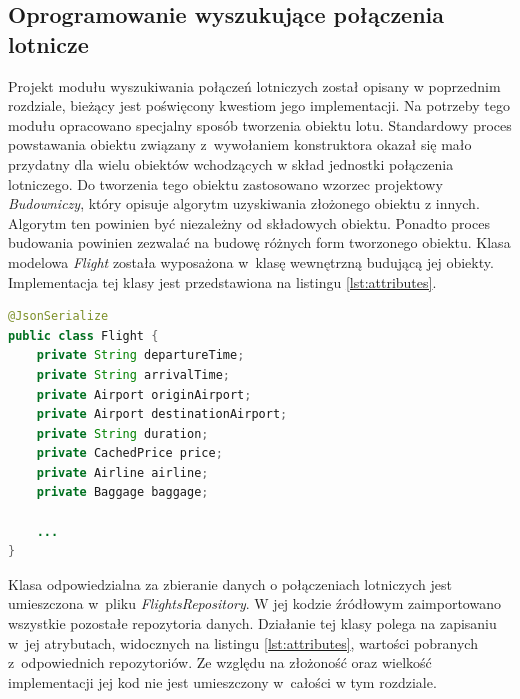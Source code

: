 \documentclass[12pt, twoside]{report}
\begin{document}
\subsection{Oprogramowanie wyszukujące połączenia lotnicze}
Projekt modułu wyszukiwania połączeń lotniczych został opisany w poprzednim rozdziale, bieżący jest poświęcony kwestiom jego implementacji. Na potrzeby tego modułu opracowano specjalny sposób tworzenia obiektu lotu. Standardowy proces powstawania obiektu związany z~wywołaniem konstruktora okazał się mało przydatny dla wielu obiektów wchodzących w skład jednostki połączenia lotniczego. Do tworzenia tego obiektu zastosowano wzorzec projektowy \textit{Budowniczy}, który opisuje algorytm uzyskiwania złożonego obiektu z innych. Algorytm ten powinien być niezależny od składowych obiektu. Ponadto proces budowania powinien zezwalać na budowę różnych form tworzonego obiektu\cite{builder}.
Klasa modelowa \textit{Flight} została wyposażona w~klasę wewnętrzną budującą jej obiekty. Implementacja tej klasy jest przedstawiona na listingu \ref{lst:attributes}.
\begin{lstlisting}[language=java, caption=Fragment klasy Flight, label=lst:attributes]
@JsonSerialize
public class Flight {
    private String departureTime;
    private String arrivalTime;
    private Airport originAirport;
    private Airport destinationAirport;
    private String duration;
    private CachedPrice price;
    private Airline airline;
    private Baggage baggage;
    
    ...
}
\end{lstlisting}
Klasa odpowiedzialna za zbieranie danych o połączeniach lotniczych jest umieszczona w~pliku \textit{FlightsRepository}. W jej kodzie źródłowym zaimportowano wszystkie pozostałe repozytoria danych. 
Działanie tej klasy polega na zapisaniu w~jej atrybutach, widocznych na listingu \ref{lst:attributes}, wartości pobranych z~odpowiednich repozytoriów. Ze względu na złożoność oraz wielkość implementacji jej kod nie jest umieszczony w~całości w tym rozdziale.
\end{document}
